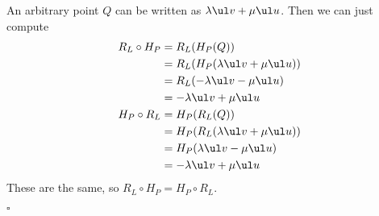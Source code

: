 \documentclass[a4paper]{article}
\begin{document}
An arbitrary point $Q$ can be written as $\lambda \ul v + \mu \ul u$. Then we can just compute
\begin{align*}
R_L \circ H_P &= R_L(H_P(Q)) \\
&= R_L(H_P(\lambda \ul v + \mu \ul u)) \\
&= R_L(- \lambda \ul v - \mu \ul u) \\
&= - \lambda \ul v + \mu \ul u \\
%
H_P \circ R_L &= H_P(R_L(Q)) \\
&= H_P(R_L(\lambda \ul v + \mu \ul u)) \\
&= H_P(\lambda \ul v - \mu \ul u) \\
&= - \lambda \ul v + \mu \ul u
\end{align*}
These are the same, so $R_L \circ H_P = H_P \circ R_L$.

\hfill $\square$


\end{document}
